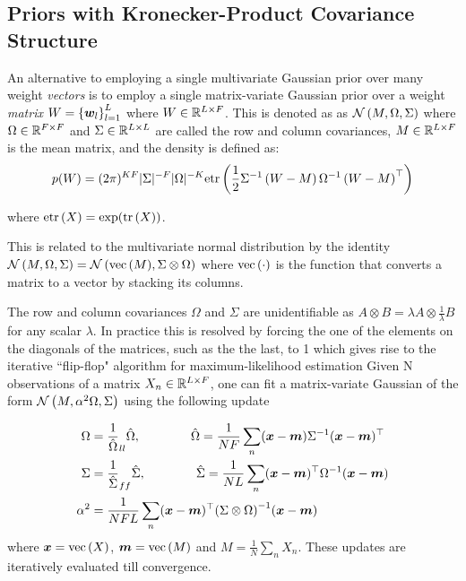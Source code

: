 

\subsection{Priors with Kronecker-Product Covariance Structure}
An alternative to employing a single multivariate Gaussian prior over many weight \emph{vectors} is to employ a single matrix-variate Gaussian\cite{Gupta1999} prior over a weight \emph{matrix} $W = \left\{\bm w_l\right\}_{l=1}^L$ where $W \in { \mathbb{R}^{L \times F} }$. This is denoted as as $\mathcal{N} \left(M, \Omega, \Sigma\right)$ where $\Omega \in { \mathbb{R}^{F \times F} }$ and $\Sigma \in { \mathbb{R}^{L \times L} }$ are called the row and column covariances, $M \in { \mathbb{R}^{L \times F} }$ is the mean matrix, and the density is defined as:
\begin{equation}
p(W) = (2\pi)^{KF}|\Sigma|^{-F}|\Omega|^{-K} \text{etr}\left( { \frac{1}{2} {\Sigma}^{-1}\left(W - M\right) {\Omega}^{-1} \left(W - M \right)^\top } \right)
\end{equation}

where $\text{etr}\left( { X } \right) = \exp (\text{tr} \left( {X} \right))$.

This is related to the multivariate normal distribution by the identity $\mathcal{N} \left(M, \Omega, \Sigma\right) = \mathcal{N} \left( {\text{vec}\left(M\right)}, {\Sigma \otimes \Omega} \right)$ where $\text{vec}\left(\cdot\right)$ is the function that converts a matrix to a vector by stacking its columns. 

The row and column covariances $\Omega$ and $\Sigma$ are unidentifiable as $A \otimes B = \lambda A \otimes \frac{1}{\lambda}B$ for any scalar $\lambda$. In practice this is resolved by forcing the one of the elements on the diagonals of the matrices, such as the the last, to 1 which gives rise to the iterative ``flip-flop" algorithm\cite{Srivastava2009} for maximum-likelihood estimation Given N observations of a matrix $X_n \in { \mathbb{R}^{L \times F} }$, one can fit a matrix-variate Gaussian of the form $\mathcal{N} \left(M, \alpha^2 \Omega, \Sigma\right)$ using the following update

\begin{align}
\Omega & = \frac{1}{\hat{\Omega}}_{ll} \hat{\Omega}, \qquad\qquad\hat{\Omega} = \frac{1}{N F} \sum_n (\bm x - \bm m) {\Sigma}^{-1} (\bm x - \bm m)^\top \\
\Sigma & = \frac{1}{\hat{\Sigma}}_{ff} \hat{\Sigma}, \qquad\qquad\hat{\Sigma} = \frac{1}{N L} \sum_n (\bm x - \bm m)^\top {\Omega}^{-1} (\bm x - \bm m) \\
\alpha^2 & = \frac{1}{NFL} \sum_n (\bm x - \bm m)^\top{\left( \Sigma \otimes \Omega \right)}^{-1}(\bm x - \bm m)
\end{align}
where $\bm x = \text{vec}\left(X\right)$, $\bm m = \text{vec}\left(M\right)$ and $M=\frac{1}{N} \sum_n X_n$. These updates are iteratively evaluated till convergence.

